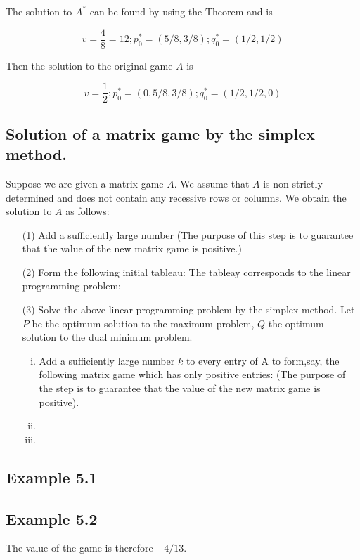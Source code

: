 \documentclass[]{report}
\begin{document}
The solution to $A^{\ast}$ can be found by using the Theorem and is

\[ v = \frac{4}{8} = {1}{2} ; p^{\ast}_{0} =(5/8,3/8); q^{\ast}_{0} =(1/2,1/2) \]

Then the solution to the original game $A$ is


\[ v= \frac{1}{2} ; p^{\ast}_{0} =(0,5/8,3/8); q^{\ast}_{0} =(1/2,1/2,0) \]

\subsection{Solution of a matrix game by the simplex method.}
Suppose we are given a matrix game $A$. We assume that $A$ is non-strictly determined and does not contain any 
recessive rows or columns. We obtain the solution to $A$ as follows:
\begin{itemize}
\item[(1)] Add a sufficiently large number
(The purpose of this step is to guarantee that the value of the new matrix game is positive.)
\item[(2)] Form the following initial tableau:
The tableay corresponds to the linear programming problem:
\item[(3)] Solve the above linear programming problem by the simplex method. Let $P$ be the
optimum solution to the maximum problem, $Q$ the optimum solution to the dual minimum problem.
\begin{multicols}{3}
\begin{enumerate}[(i)]
\item Add a sufficiently large number $k$ to every entry of A to form,say, the following matrix game which has only positive entries:
(The purpose of the step is to guarantee that the value of the new matrix game is positive).
\item
\item
\end{enumerate}
\end{multicols}
\end{itemize}
\subsection*{Example 5.1}
\subsection*{Example 5.2}
The value of the game is therefore $-4/13$.
\end{document}
